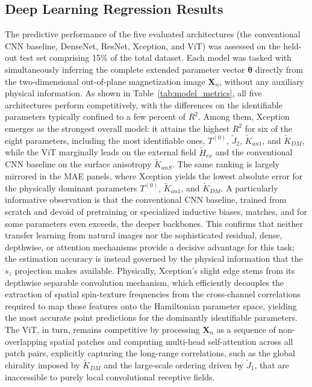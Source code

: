 \documentclass[final,5p,times,twocolumn]{elsarticle}
\begin{document}
\subsection{Deep Learning Regression Results}\label{sec:dl_results}

The predictive performance of the five evaluated architectures (the
conventional CNN baseline, DenseNet, ResNet, Xception, and ViT) was
assessed on the held-out test set comprising 15\% of the total dataset.
Each model was tasked with simultaneously inferring the complete
extended parameter vector $\boldsymbol{\theta}$ directly from the
two-dimensional out-of-plane magnetization image $\mathbf{X}_n$,
without any auxiliary physical information. As shown in
Table~\ref{tab:model_metrics}, all five
architectures perform competitively, with the differences on the
identifiable parameters typically confined to a few percent of $R^2$.
Among them, Xception emerges as the strongest overall model: it attains
the highest $R^2$ for six of the eight parameters,  including the
most identifiable ones, $T^{(0)}$, $\tilde{J}_2$, $\tilde{K}_{an1}$,
and $\tilde{K}_{DM}$,  while the ViT marginally leads on the external
field $\tilde{H}_{ex}$ and the conventional CNN baseline on the surface
anisotropy $\tilde{K}_{anS}$. The same ranking is largely mirrored in
the MAE panels, where Xception yields the lowest absolute error for the
physically dominant parameters $T^{(0)}$, $\tilde{K}_{an1}$, and
$\tilde{K}_{DM}$. A particularly informative observation is that the
conventional CNN baseline,  trained from scratch and devoid of
pretraining or specialized inductive biases,  matches, and for some
parameters even exceeds, the deeper backbones. This confirms that
neither transfer learning from natural images nor the sophisticated
residual, dense, depthwise, or attention mechanisms provide a decisive
advantage for this task; the estimation accuracy is instead governed by
the physical information that the $s_z$ projection makes available.
Physically, Xception's slight edge stems from its depthwise separable
convolution mechanism, which efficiently decouples the extraction of
spatial spin-texture frequencies from the cross-channel correlations
required to map those features onto the Hamiltonian parameter space,
yielding the most accurate point predictions for the dominantly
identifiable parameters. The ViT, in turn, remains competitive by
processing $\mathbf{X}_n$ as a sequence of non-overlapping spatial
patches and computing multi-head self-attention across all patch pairs,
explicitly capturing the long-range correlations, such as the global
chirality imposed by $\tilde{K}_{DM}$ and the large-scale ordering
driven by $\tilde{J}_1$, that are inaccessible to purely local
convolutional receptive fields.
\end{document}
